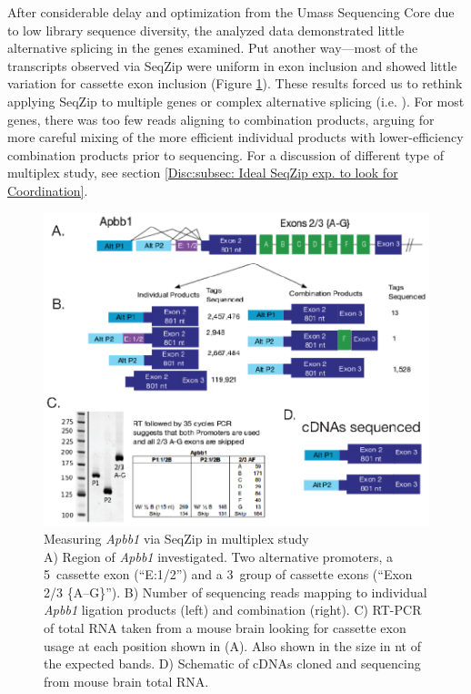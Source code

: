   After considerable delay and optimization from the Umass Sequencing Core due to low library sequence diversity, the analyzed data demonstrated little alternative splicing in the genes examined. Put another way---most of the transcripts observed via SeqZip were uniform in exon inclusion and showed little variation for cassette exon inclusion (Figure \ref{SeqZipMethod:fig:Apbb1 Results}). These results forced us to rethink applying SeqZip to multiple genes or complex alternative splicing (i.e. \dscam{}). For most genes, there was too few reads aligning to combination products, arguing for more careful mixing of the more efficient individual products with lower-efficiency combination products prior to sequencing. For a discussion of different type of multiplex study, see section \ref{Disc:subsec: Ideal SeqZip exp. to look for Coordination}.

  \begin{figure} %
    \centering 
    \includegraphics{Figures/SeqZipMethod/Apbb1.eps}
    \caption[Measuring \textit{Apbb1} via SeqZip in multiplex study]
    {
      Measuring \textit{Apbb1} via SeqZip in multiplex study\\[0.25cm]
      A) Region of \textit{Apbb1} investigated. Two alternative promoters, a 5\textprime~cassette exon (``E:1/2'') and a 3\textprime~group of cassette exons (``Exon 2/3 \{A--G\}''). B) Number of sequencing reads mapping to individual \textit{Apbb1} ligation products (left) and combination (right). C) RT-PCR of total RNA taken from a mouse brain looking for cassette exon usage at each position shown in (A). Also shown in the size in nt of the expected bands. D) Schematic of cDNAs cloned and sequencing from mouse brain total RNA.
      }
    \label{SeqZipMethod:fig:Apbb1 Results}
    \end{figure}

